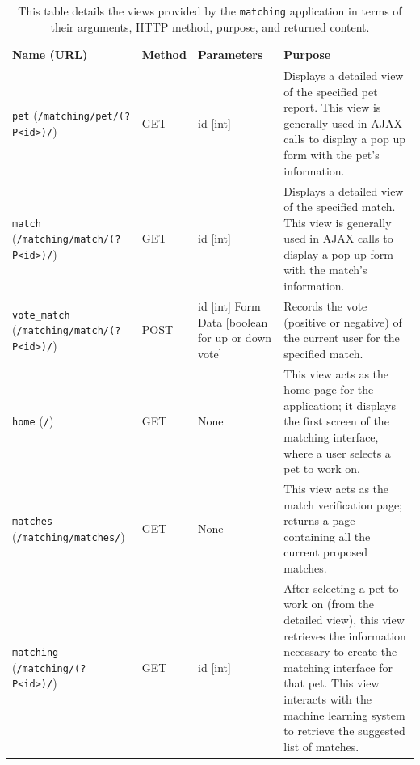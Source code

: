 \begin{table}[htb]
    \caption[Views provided by {\tt matching} subsystem]{
	This table details the views provided by the {\tt matching} application in terms of their arguments, HTTP method, purpose, and returned content.
	}
    \begin{center}
    \begin{tabularx}{ \textwidth}{| p{5cm} | l | p{2.5cm} | X | } 
    \hline
    	Name (URL) & Method & Parameters & Purpose \\  \hline \hline

	{\tt pet} \newline ({\tt /matching/pet/\newline(?P<id>)/}) & GET & id [int] & Displays a detailed view of the specified pet report.  This view is generally used in AJAX calls to display a pop up form with the pet's information.\\ \hline
	{\tt match} \newline ({\tt /matching/match/\newline(?P<id>)/}) & GET & id [int] & Displays a detailed view of the specified match.  This view is generally used in AJAX calls to display a pop up form with the match's information.\\ \hline
	{\tt vote_match} \newline ({\tt /matching/match/\newline(?P<id>)/}) & POST & id [int] \newline Form Data [boolean for up or down vote] & Records the vote (positive or negative) of the current user for the specified match.\\ \hline
	{\tt home} \newline ({\tt /}) & GET & None & This view acts as the home page for the application; it displays the first screen of the matching interface, where a user selects a pet to work on.\\ \hline
	{\tt matches} \newline ({\tt /matching/matches/}) & GET & None & This view acts as the match verification page; returns a page containing all the current proposed matches.\\ \hline
	{\tt matching} \newline ({\tt /matching/(?P<id>)/}) & GET & id [int] & After selecting a pet to work on (from the detailed view), this view retrieves the information necessary to create the matching interface for that pet.  This view interacts with the machine learning system to retrieve the suggested list of matches.\\ \hline

\end{tabularx}
\end{center}
\end{table}
